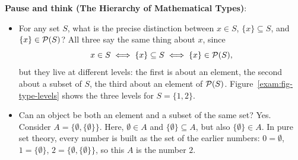 \begin{recoverybox}
\textbf{Pause and think (The Hierarchy of Mathematical Types)}:
\begin{itemize}
  \item For any set $S$, what is the precise distinction between $x \in S$, $\{x\} \subseteq S$, and $\{x\} \in \mathcal{P}(S)$? All three say the same thing about $x$, since
  \[
  x \in S \iff \{x\} \subseteq S \iff \{x\} \in \mathcal{P}(S),
  \]
  but they live at different levels: the first is about an element, the second about a subset of $S$, the third about an element of $\mathcal{P}(S)$. Figure~\ref{exam:fig-type-levels} shows the three levels for $S = \{1, 2\}$.
  \item Can an object be both an element and a subset of the same set? Yes. Consider $A = \{\emptyset, \{\emptyset\}\}$. Here, $\emptyset \in A$ and $\{\emptyset\} \subseteq A$, but also $\{\emptyset\} \in A$. In pure set theory, every number is built as the set of the earlier numbers: $0 = \emptyset$, $1 = \{\emptyset\}$, $2 = \{\emptyset, \{\emptyset\}\}$, so this $A$ is the number $2$.
\end{itemize}
\end{recoverybox}

